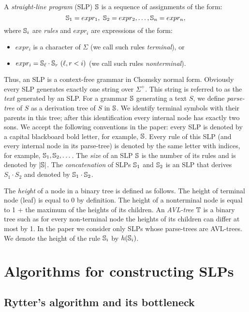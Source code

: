 \documentclass[10pt]{article}
\begin{document}
A \emph{straight-line program} (SLP) $\mathbb{S}$ is a sequence of assignments of the form: $$\mathbb{S}_1 = expr_1,\
\mathbb{S}_2 = expr_2, \dots, \mathbb{S}_n = expr_n,$$ where $\mathbb{S}_i$ are \emph{rules} and $expr_i$ are expressions of
the form:
\begin{itemize}
\item $expr_i$ is a character of $\Sigma$ (we call such rules \emph{terminal}), or
\item $expr_i = \slp{S}_\ell\cdot \slp{S}_r \ (\ell, r < i)$ (we call such rules \emph{nonterminal}).
\end{itemize}

Thus, an SLP is a context-free grammar in Chomsky normal form. Obviously every SLP generates exactly one string over
$\Sigma^+$. This string is referred to as the \emph{text} generated by an SLP. For a grammar $\mathbb{S}$ generating a text
$S$, we define \emph{parse-tree} of $S$ as a derivation tree of $S$ in $\mathbb{S}$. We identify terminal symbols with
their parents in this tree; after this identification every internal node has exactly two sons. We accept the
following conventions in the paper: every SLP is denoted by a capital blackboard bold letter, for example, $\mathbb{S}$.
Every rule of this SLP (and every internal node in its parse-tree) is denoted by the same letter with indices, for
example, $\mathbb{S}_1,\mathbb{S}_2,\dots$. The \emph{size} of an SLP $\mathbb{S}$ is the number of its rules and is denoted by
$|\mathbb{S}|$. The \emph{concatenation} of SLPs $\mathbb{S}_1$ and $\mathbb{S}_2$ is an SLP that derives
$S_1 \cdot S_2$ and denoted by $\mathbb{S}_1 \cdot \mathbb{S}_2$.

The \emph{height} of a node in a binary tree is defined as follows. The height of terminal node (leaf) is equal to 0 by
definition. The height of a nonterminal node is equal to 1 + the maximum of the heights of its children. An
\emph{AVL-tree} $\mathbb{T}$ is a binary tree such as for every non-terminal node the heights of its children can differ at
most by 1. In the paper we consider only SLPs whose parse-trees are AVL-trees. We denote the height of the rule
$\mathbb{S}_i$ by $h(\mathbb{S}_i)$.

\section{Algorithms for constructing SLPs}

\subsection{Rytter's algorithm and its bottleneck}
\end{document}
